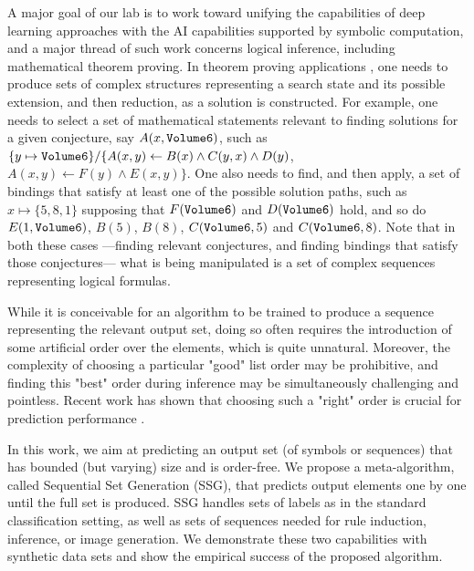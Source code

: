 \documentclass[letterpaper]{article} %
\newcommand{\citep}{\cite}
\begin{document}
A major goal of our lab is to work toward unifying the capabilities of deep learning approaches with the AI capabilities supported by symbolic computation, and a major thread of such work concerns logical inference, including mathematical theorem proving. In theorem proving applications \cite{irving2016deepmath}, one needs to produce sets of complex structures representing a search state and its possible extension, and then reduction, as a solution is constructed. For example, one needs to select a set of mathematical statements relevant to finding solutions for a given conjecture, say $A(x,{\tt Volume6})$, such as $\{y\mapsto {\tt Volume6}\} \slash \{A(x,y) \leftarrow B(x) \wedge C(y,x) \wedge D(y)$,  $A(x,y) \leftarrow F(y) \wedge E(x,y)\}$. One also needs to find, and then apply, a set of bindings that satisfy at least one of the possible solution paths, such as $x\mapsto\{5,8,1\}$ supposing that $F({\tt Volume6})$ and $D({\tt Volume6})$ hold, and so do $E(1,{\tt Volume6})$, $B(5)$, $B(8)$, $C({\tt Volume6},5)$ and $C({\tt Volume6},8)$. Note that in both these cases ---finding relevant conjectures, and finding bindings that satisfy those conjectures--- what is being manipulated is a set of complex sequences representing logical formulas.

While it is conceivable for an algorithm to be trained to produce a sequence representing the relevant output set, doing so often requires the introduction of some artificial order over the elements, which is quite unnatural. Moreover, the complexity of choosing a particular "good" list order may be prohibitive, and finding this "best" order during inference may be simultaneously challenging and pointless. Recent work has shown that choosing such a "right" order is crucial for prediction performance \citep{order_matters}.

In this work, we aim at predicting an output set (of symbols or sequences) that has bounded (but varying) size and is order-free. We propose a meta-algorithm, called Sequential Set Generation (SSG), that predicts output elements one by one until the full set is produced. SSG handles sets of labels as in the standard classification setting, as well as sets of sequences needed for rule induction, inference, or image generation. We demonstrate these two capabilities with synthetic data sets and show the empirical success of the proposed algorithm.
%
%
%
\end{document}
